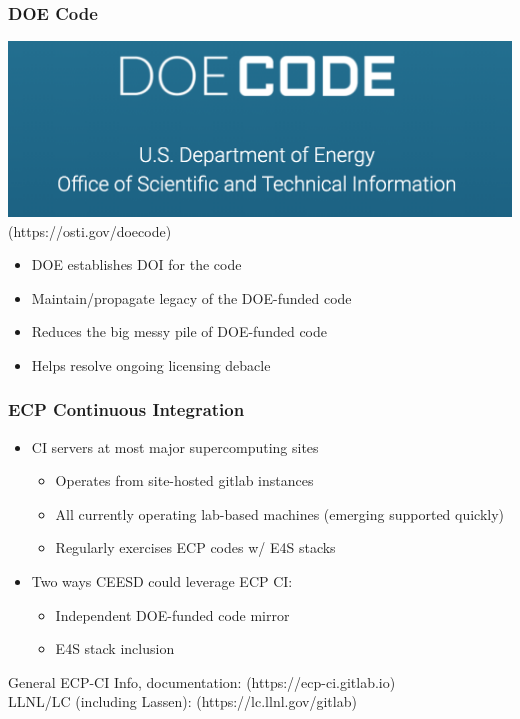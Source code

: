 \begin{frame}\frametitle{DOE Code}
\begin{center}
\includegraphics[width=.5\textwidth]{figures/doecode.png}\\
(https://osti.gov/doecode)
\end{center}
\begin{itemize}
\item DOE establishes DOI for the code
\item Maintain/propagate legacy of the DOE-funded code
\item Reduces the big messy pile of DOE-funded code
\item Helps resolve ongoing licensing debacle
\end{itemize}
\end{frame}

\begin{frame}\frametitle{ECP Continuous Integration}
\begin{itemize}
\item CI servers at most major supercomputing sites
\begin{itemize}
\item Operates from site-hosted gitlab instances
\item All currently operating lab-based machines (emerging supported quickly)
\item Regularly exercises ECP codes w/ E4S stacks
\end{itemize}
\item Two ways CEESD could leverage ECP CI:
\begin{itemize}
\item Independent DOE-funded code mirror
\item E4S stack inclusion
\end{itemize}
\end{itemize}
\begin{center}
General ECP-CI Info, documentation: (https://ecp-ci.gitlab.io)\\
LLNL/LC (including Lassen): (https://lc.llnl.gov/gitlab)
\end{center}
\end{frame}

